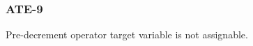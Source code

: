 \subsubsection{ATE-9}\label{sec:error_code_ate_9}

Pre-decrement operator target variable is not assignable.


